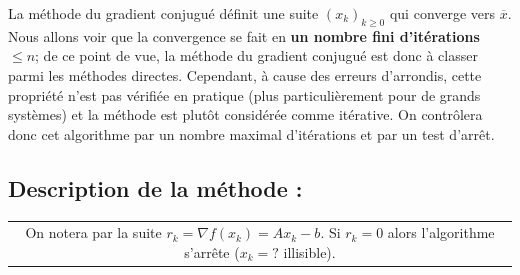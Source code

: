 La méthode du gradient conjugué définit une suite $(x_k)_{k\geq 0}$ qui
converge vers $\overline{x}$. Nous allons voir que la convergence se fait
en \textbf{un nombre fini d'itérations $\leq n$};  de ce point de vue,
la méthode du gradient conjugué est donc à classer parmi les méthodes
directes. Cependant, à cause des erreurs d'arrondis, cette propriété
n'est pas vérifiée en pratique (plus particulièrement pour de grands
systèmes) et la méthode est plutôt considérée comme itérative. On
contrôlera donc cet algorithme par un nombre maximal d'itérations et
par un test d'arrêt.

\subsection{Description de la méthode :}

\noindent
\begin{tabular}{||c}
    \begin{minipage}[c]{15cm}
        On notera par la suite $r_k = \nabla f(x_k) = A x_k - b$. Si
        $r_k = 0$ alors l'algorithme s'arrête ($x_k = ?$ illisible).
    \end{minipage}
\end{tabular}

